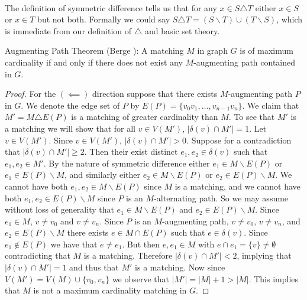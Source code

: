\paragraph{}
The definition of symmetric difference tells us that for any $x \in S \triangle T$ either $x \in S$ or $x \in T$ but not both. Formally we could say $S \triangle T = (S \backslash T) \cup (T \backslash S)$, which is immediate from our definition of $\triangle$ and basic set theory.
\begin{theorem} Augmenting Path Theorem (Berge \cite{berge1957two}): A matching $M$ in graph $G$ is of maximum cardinality if and only if there does not exist any $M$-augmenting path contained in $G$.
\end{theorem}
\begin{proof}For the $(\impliedby)$ direction suppose that there exists $M$-augmenting path $P$ in $G$. We denote the edge set of $P$ by $E(P) = \{v_0v_1, \dots, v_{n-1}v_n\}$. We claim that $M' = M \triangle E(P)$ is a matching of greater cardinality than $M$. To see that $M'$ is a matching we will show that for all $v \in V(M')$, $|\delta(v) \cap M'| = 1$. Let $v \in V(M')$. Since $v \in V(M')$, $|\delta(v) \cap M'| > 0$. Suppose for a contradiction that $|\delta(v) \cap M'| \geq 2$. Then their exist distinct $e_1, e_2 \in \delta(v)$ such that $e_1, e_2 \in M'$. By the nature of symmetric difference either $e_1 \in M \backslash E(P)$ or $e_1 \in E(P) \backslash M$, and similarly either $e_2 \in M \backslash E(P)$ or $ e_2 \in E(P)\backslash M$. We cannot have both $e_1, e_2 \in M \backslash E(P)$ since $M$ is a matching, and we cannot have both $e_1, e_2 \in E(P) \backslash M$ since $P$ is an $M$-alternating path. So we may assume without loss of generality that $e_1 \in M \backslash E(P)$ and $e_2 \in E(P) \backslash M$. Since $e_1 \in M$, $v \neq v_0$ and $v \neq v_n$. Since $P$ is an $M$-augmenting path, $v \neq v_0$, $v \neq v_n$, and $e_2 \in E(P) \backslash M$ there exists $e \in M \cap E(P)$ such that $e \in \delta(v)$. Since $e_1 \not\in E(P)$ we have that $e \neq e_1$. But then $e, e_1 \in M$ with $e \cap e_1 = \{v\} \neq \emptyset$ contradicting that $M$ is a matching. Therefore $|\delta(v) \cap M'| < 2$, implying that $|\delta(v) \cap M'| = 1$ and thus that $M'$ is a matching. Now since $V(M') = V(M) \cup \{v_0, v_n\}$ we observe that $|M'| = |M| + 1 > |M|$. This implies that $M$ is not a maximum cardinality matching in $G$.

\end{proof}
